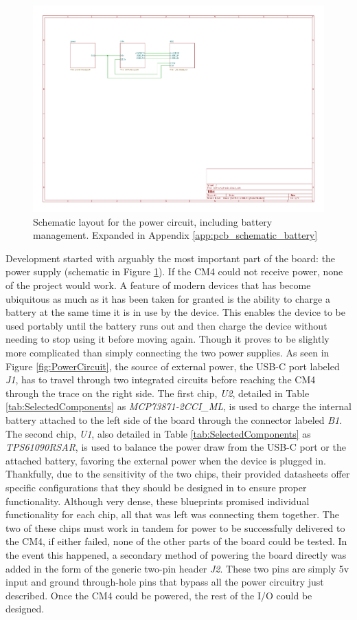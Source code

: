 \begin{figure}[b!]
  \centering
  \includegraphics[width=.75\textwidth,page=2]{Figures/kicad/lathrum_thesis_schematic.pdf}
  \caption[Power Schematic]{Schematic layout for the power circuit, including battery management. Expanded in Appendix \ref{app:pcb_schematic_battery}}
  \label{fig:pcb_schematic_battery}
\end{figure}

Development started with arguably the most important part of the board: the power supply (schematic in Figure \ref{fig:pcb_schematic_battery}).
If the CM4 could not receive power, none of the project would work.
A feature of modern devices that has become ubiquitous as much as it has been taken for granted is the ability to charge a battery at the same time it is in use by the device.
This enables the device to be used portably until the battery runs out and then charge the device without needing to stop using it before moving again.
Though it proves to be slightly more complicated than simply connecting the two power supplies.
As seen in Figure \ref{fig:PowerCircuit}, the source of external power, the USB-C port labeled \emph{J1}, has to travel through two integrated circuits before reaching the CM4 through the trace on the right side.
The first chip, \emph{U2}, detailed in Table \ref{tab:SelectedComponents} as \emph{MCP73871-2CCI\_ML}, is used to charge the internal battery attached to the left side of the board through the connector labeled \emph{B1}.
The second chip, \emph{U1}, also detailed in Table \ref{tab:SelectedComponents} as \emph{TPS61090RSAR}, is used to balance the power draw from the USB-C port or the attached battery, favoring the external power when the device is plugged in.
Thankfully, due to the sensitivity of the two chips, their provided datasheets offer specific configurations that they should be designed in to ensure proper functionality.
Although very dense, these blueprints promised individual functionality for each chip, all that was left was connecting them together.
The two of these chips must work in tandem for power to be successfully delivered to the CM4, if either failed, none of the other parts of the board could be tested.
In the event this happened, a secondary method of powering the board directly was added in the form of the generic two-pin header \emph{J2}.
These two pins are simply 5v input and ground through-hole pins that bypass all the power circuitry just described.
Once the CM4 could be powered, the rest of the I/O could be designed.

